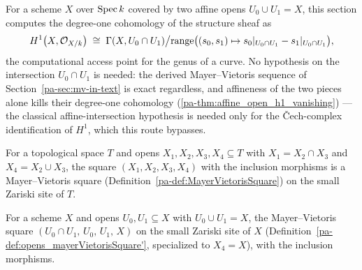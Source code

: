 For a scheme \(X\) over \(\operatorname{Spec} k\) covered by two affine opens \(U_0 \cup U_1 = X\), this
section computes the degree-one cohomology of the structure sheaf as
\[
  H^1\bigl(X, \mathcal{O}_{X/k}\bigr) \;\cong\;
    \Gamma(X, U_0 \cap U_1) \big/
      \mathrm{range}\bigl((s_0,s_1) \mapsto s_0|_{U_0 \cap U_1} - s_1|_{U_0 \cap U_1}\bigr),
\]
the computational access point for the genus of a curve. No hypothesis on the intersection
\(U_0 \cap U_1\) is needed: the derived Mayer--Vietoris sequence of Section~\ref{pa-sec:mv-in-text}
is exact regardless, and affineness of the two pieces alone kills their degree-one
cohomology (\ref{pa-thm:affine_open_h1_vanishing}) --- the classical affine-intersection
hypothesis is needed only for the \v{C}ech-complex identification of \(H^1\), which this
route bypasses.

\begin{definition}
  \label{pa-def:opens_mayerVietorisSquare'}
  \mathlibok

  For a topological space \(T\) and opens \(X_1,X_2,X_3,X_4 \subseteq T\) with
  \(X_1 = X_2 \cap X_3\) and \(X_4 = X_2 \cup X_3\), the square \((X_1,X_2,X_3,X_4)\) with the
  inclusion morphisms is a Mayer--Vietoris square (Definition~\ref{pa-def:MayerVietorisSquare})
  on the small Zariski site of \(T\).
\end{definition}

\begin{definition}
  \label{pa-def:twoCoverSquare}
  \leanok

  For a scheme \(X\) and opens \(U_0, U_1 \subseteq X\) with \(U_0 \cup U_1 = X\), the
  Mayer--Vietoris square \((U_0 \cap U_1,\, U_0,\, U_1,\, X)\) on the small Zariski site of
  \(X\) (Definition~\ref{pa-def:opens_mayerVietorisSquare'}, specialized to \(X_4 = X\)), with
  the inclusion morphisms.
\end{definition}

